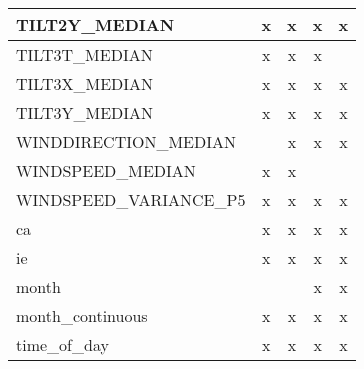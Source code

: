 \begin{table}
\begin{tabular}{lcccc}
        TILT2Y\_MEDIAN       &      x &      x &      x &      x    \\ \hline
        TILT3T\_MEDIAN       &      x &      x &      x &          \\ \hline
        TILT3X\_MEDIAN       &      x &      x &      x &      x   \\ \hline
        TILT3Y\_MEDIAN       &      x &      x &      x &      x   \\ \hline
        WINDDIRECTION\_MEDIAN &        &      x &      x &      x  \\ \hline
        WINDSPEED\_MEDIAN     &      x &      x &        &         \\ \hline
        WINDSPEED\_VARIANCE\_P5 &      x &      x &      x &      x  \\ \hline
        ca                   &      x &      x &      x &      x    \\ \hline
        ie                   &      x &      x &      x &      x    \\ \hline
        month                &        &        &      x &      x    \\ \hline
        month\_continuous    &      x &      x &      x &      x    \\ \hline
        time\_of\_day        &      x &      x &      x &      x    \\ \hline
    \end{tabular}        
    \label{tab:exp2_top50_features}
\end{table}


